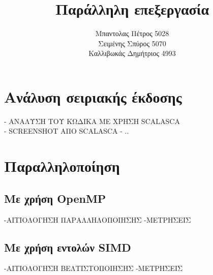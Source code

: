 \documentclass{article}
\title{Παράλληλη επεξεργασία}
\author{Μπαντολας Πέτρος 5028\\Σειμένης Σπύρος 5070\\Καλλιβωκάς Δημήτριος 4993}
\begin{document}
\maketitle
\section{Ανάλυση σειριακής έκδοσης}
- ΑΝΑΛΥΣΗ ΤΟΥ ΚΩΔΙΚΑ ΜΕ ΧΡΗΣΗ SCALASCA\\
- SCREENSHOT ΑΠΟ SCALASCA
- ..

\section{Παραλληλοποίηση}
\subsection{Με χρήση OpenMP}
-ΑΙΤΙΟΛΟΓΗΣΗ ΠΑΡΑΛΛΗΛΟΠΟΙΗΣΗΣ
-ΜΕΤΡΗΣΕΙΣ

\subsection{Με χρήση εντολών SIMD}
-ΑΙΤΙΟΛΟΓΗΣΗ ΒΕΛΤΙΣΤΟΠΟΙΗΣΗΣ
-ΜΕΤΡΗΣΕΙΣ
\end{document}
